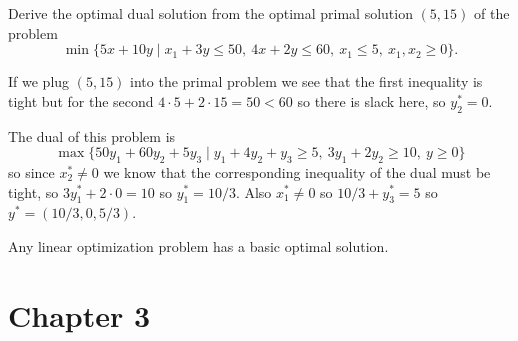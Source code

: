 \documentclass{exam}
\begin{document}
    \begin{question}
        Derive the optimal dual solution from the optimal primal solution $(5, 15)$ of the problem
        \[
            \min \{ 5x + 10y \mid x_1 + 3y\le 50,\ 4x+2y \le 60,\ x_1 \le 5,\ x_1,x_2 \ge 0 \}.
        \]
    \end{question}
    \begin{answer}
        If we plug $(5,15)$ into the primal problem we see that the first inequality is tight but for the second $4\cdot 5 + 2 \cdot 15 = 50 < 60$ so there is slack here, so $y_2^* =0$.
        
        The dual of this problem is 
        \[
            \max \{ 50 y_1 + 60 y_2 + 5 y_3 \mid y_1 + 4 y_2 + y_3 \ge 5,\ 3y_1 + 2y_2 \ge 10,\ y \ge 0 \}
        \]
        so since $x_2^* \neq 0$ we know that the corresponding inequality of the dual must be tight, so $3y_1^* + 2 \cdot 0 = 10$ so $y_1^* = 10/3$.
        Also $x_1^* \neq 0$ so $10/3 + y_3^* =5$ so $y^* = (10/3, 0, 5/3)$.
    \end{answer}
    \begin{theorem}
        Any linear optimization problem has a basic optimal solution.
    \end{theorem}

    \section{Chapter 3}\label{sec:chapter3}
\end{document}
